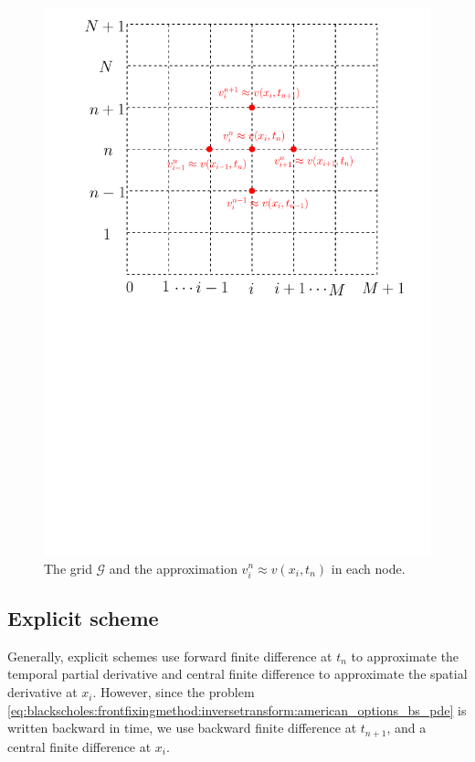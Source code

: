 \begin{figure}
  \centering
  \includegraphics[scale=0.5]{chapters/chapter3/GridAproximation.pdf}
  \caption{The grid $\mathcal{G}$ and the approximation $v^{n}_{i} \approx v(x_i, t_n)$ in each node.}
  \label{fig:finitediferencesschemes:grid}
\end{figure}
\newpage
\subsection{Explicit scheme}
Generally, explicit schemes use forward finite difference at $t_n$ to approximate the temporal partial derivative and central finite difference to approximate the spatial derivative at $x_i$. However, since the problem \eqref{eq:blackscholes:frontfixingmethod:inversetransform:american_options_bs_pde} is written backward in time, we use backward finite difference at $t_{n+1}$, and a central finite difference at $x_i$.

